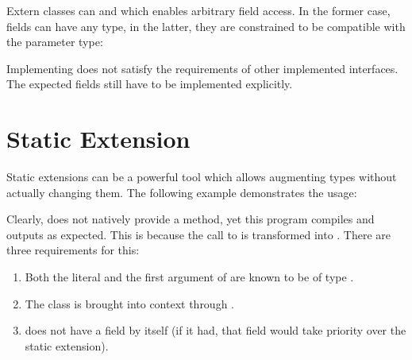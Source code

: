 Extern classes can   and  which enables arbitrary field access. In the former case, fields can have any type, in the latter, they are constrained to be compatible with the parameter type:


Implementing  does not satisfy the requirements of other implemented interfaces. The expected fields still have to be implemented explicitly.



\section{Static Extension}
\label{lf-static-extension}


Static extensions can be a powerful tool which allows augmenting types without actually changing them. The following example demonstrates the usage:


Clearly,  does not natively provide a  method, yet this program compiles and outputs  as expected. This is because the call to  is transformed into . There are three requirements for this:

\begin{enumerate}
	\item Both the literal  and the first argument of  are known to be of type .
	\item The class  is brought into context through .
	\item {} does not have a  field by itself (if it had, that field would take priority over the static extension).
\end{enumerate}

